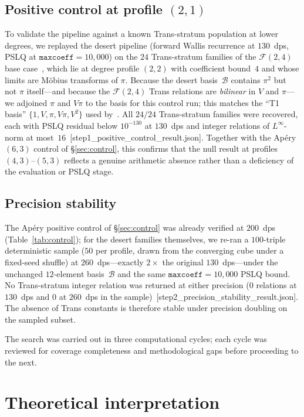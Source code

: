 \documentclass[11pt]{amsart}
\newcommand{\calB}{\mathcal{B}}
\theoremstyle{plain}
\theoremstyle{remark}
\begin{document}
\subsection*{Positive control at profile $(2,1)$}
To validate the pipeline against a known Trans-stratum population
at lower degrees, we replayed the desert pipeline (forward Wallis
recurrence at $130$~dps, PSLQ at $\texttt{maxcoeff} = 10{,}000$)
on the $24$ Trans-stratum families of the $\mathcal{F}(2,4)$ base
case~\cite{P11}, which lie at degree profile $(2,2)$ with
coefficient bound~$4$ and whose limits are M\"obius transforms of
$\pi$.  Because the desert basis~$\calB$ contains $\pi^2$ but not
$\pi$ itself---and because the $\mathcal{F}(2,4)$ Trans relations are
\emph{bilinear} in $V$ and $\pi$---we adjoined $\pi$ and $V\pi$ to
the basis for this control run; this matches the ``T1 basis''
$\{1, V, \pi, V\pi, V^2\}$ used by~\cite{P11}.
All $24/24$ Trans-stratum families were recovered, each with PSLQ
residual below $10^{-130}$ at $130$~dps and integer relations of
$L^\infty$-norm at most~$16$~[step1\_positive\_control\_result.json].
Together with the Ap\'ery $(6,3)$ control of
\S\ref{sec:control}, this confirms that the null result at
profiles $(4,3)$--$(5,3)$ reflects a genuine arithmetic absence
rather than a deficiency of the evaluation or PSLQ stage.

\subsection*{Precision stability}
The Ap\'ery positive control of \S\ref{sec:control} was already
verified at $200$~dps (Table~\ref{tab:control}); for the desert
families themselves, we re-ran a $100$-triple deterministic
sample ($50$ per profile, drawn from the converging cube under a
fixed-seed shuffle) at $260$~dps---exactly $2\times$ the original
$130$~dps---under the unchanged $12$-element basis~$\calB$ and the
same $\texttt{maxcoeff} = 10{,}000$ PSLQ bound.
No Trans-stratum integer relation was returned at either precision
($0$ relations at $130$~dps and $0$ at $260$~dps in the
sample)~[step2\_precision\_stability\_result.json].
The absence of Trans constants is therefore stable under precision
doubling on the sampled subset.

The search was carried out in three computational cycles;
each cycle was reviewed for coverage completeness and
methodological gaps before proceeding to the next.

\section{Theoretical interpretation}\label{sec:theory}
\end{document}
